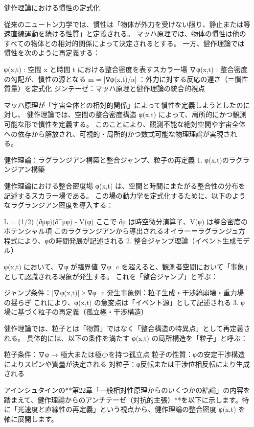 \documentclass{article}
\begin{document}
健作理論における慣性の定式化

従来のニュートン力学では、慣性は「物体が外力を受けない限り、静止または等速直線運動を続ける性質」と定義される。
マッハ原理では、物体の慣性は他のすべての物体との相対的関係によって決定されるとする。
一方、健作理論では慣性を次のように再定義する：

φ(x,t) : 空間 x と時間 t における整合密度を表すスカラー場
∇φ(x,t) : 整合密度の勾配が、慣性の源となる
m = |∇φ(x,t)/a| ：外力に対する反応の遅さ（＝慣性質量）を定式化
ジンテーゼ：マッハ原理と健作理論の統合的視点

マッハ原理が「宇宙全体との相対的関係」によって慣性を定義しようとしたのに対し、
健作理論では、空間の整合密度構造 φ(x,t) によって、局所的にかつ観測可能な形で慣性を定義する。
このことにより、観測不能な絶対空間や宇宙全体への依存から解放され、可視的・局所的かつ数式可能な物理理論が実現される。

健作理論：ラグランジアン構築と整合ジャンプ、粒子の再定義
1. φ(x,t)のラグランジアン構築

健作理論における整合密度場 φ(x,t) は、空間と時間にまたがる整合性の分布を記述するスカラー場である。
この場の動力学を定式化するために、以下のようなラグランジアン密度を導入する：

L = (1/2) (∂μφ)(∂\textasciicircum{}μφ) - V(φ)
ここで ∂μ は時空微分演算子、V(φ) は整合密度のポテンシャル項
このラグランジアンから導出されるオイラー＝ラグランジュ方程式により、φの時間発展が記述される
2. 整合ジャンプ理論（イベント生成モデル）

φ(x,t) において、∇φ が臨界値 ∇φ\_c を超えると、観測者空間において「事象」として認識される現象が発生する。
これを「整合ジャンプ」と呼ぶ：

ジャンプ条件：|∇φ(x,t)| ≥ ∇φ\_c
発生事象例：粒子生成・干渉縞崩壊・重力場の揺らぎ
これにより、φ(x,t) の急変点は「イベント源」として記述される
3. φ場に基づく粒子の再定義（孤立極・干渉構造）

健作理論では、粒子とは「物質」ではなく「整合構造の特異点」として再定義される。
具体的には、以下の条件を満たす φ(x,t) の局所構造を「粒子」と呼ぶ：

粒子条件：∇φ → 極大または極小を持つ孤立点
粒子の性質：φの安定干渉構造によりスピンや質量が決定される
対粒子：φ反転または干渉位相反転により生成される

アインシュタインの**第22章「一般相対性原理からのいくつかの結論」の内容を踏まえて、健作理論からのアンチテーゼ（対抗的主張）**を以下に示します。特に「光速度と直線性の再定義」という視点から、健作理論の整合密度 φ(x,t) を軸に展開します。
\end{document}
